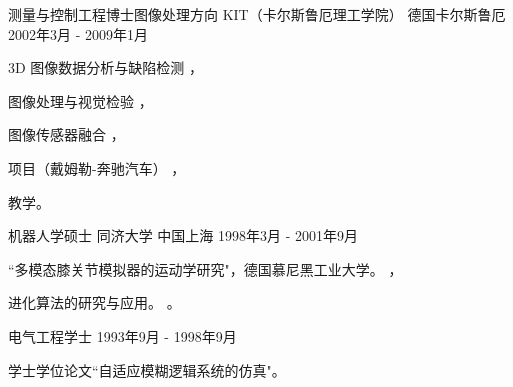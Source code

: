 \documentclass[../resume_cn.tex]{subfiles}
\begin{document}
\begin{cventries}
  \cventry
    {测量与控制工程博士\quad 图像处理方向} %
    {KIT（卡尔斯鲁厄理工学院）} %
    {德国卡尔斯鲁厄} %
    {2002年3月 - 2009年1月} %
    {
      \begin{cvitems} %
        \item 3D 图像数据分析与缺陷检测 \supercite{xin2008diss}，
        \item 图像处理与视觉检验 \supercite{xin2009multiscale}，
        \item 图像传感器融合 \supercite{xin2004bildfolgenauswertung}，
        \item 项目（戴姆勒-奔驰汽车） \supercite{Xin_Daimler_08}，
        \item 教学。
      \end{cvitems}
    }

  \cventry
    {机器人学硕士} %
    {同济大学} %
    {中国上海} %
    {1998年3月 - 2001年9月} %
    {
      \begin{cvitems} %
        \item ``多模态膝关节模拟器的运动学研究"，德国慕尼黑工业大学。 \supercite{xin2002KneeSimulator}，
        \item 进化算法的研究与应用。 \supercite{xin2002AntColony}。
      \end{cvitems}
    }

  \cventry
    {电气工程学士} %
    {} %
    {} %
    {1993年9月 - 1998年9月} %
    {
      \begin{cvitems} %
        \item 学士学位论文``自适应模糊逻辑系统的仿真"。
      \end{cvitems}
    }

\end{cventries}
\end{document}
